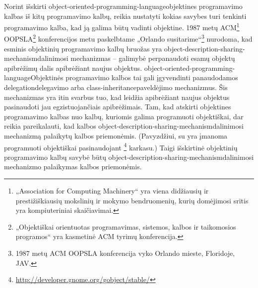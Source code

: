 Norint išskirti \gls{object-oriented-programming-language}{objektines
programavimo kalbas} iš kitų programavimo kalbų, reikia nustatyti
kokias savybes turi tenkinti programavimo kalba, kad ją galima būtų
vadinti objektine. 1987 metų
ACM\footnote{„Association for Computing Machinery“ yra viena didžiausių
ir prestižiškiausių mokslinių ir mokymo bendruomenių, kurių domėjimosi
sritis yra kompiuteriniai skaičiavimai.}
OOPSLA\footnote{„Objektiškai orientuotas programavimas, sistemos, kalbos
ir taikomosios programos“  yra kasmetinė ACM tyrimų konferencija.}
konferencijos metu paskelbtame „Orlando
susitarime“\footnote{1987 metų ACM OOPSLA konferencija vyko Orlando
mieste, Floridoje, JAV.}
\cite{Lieberman:1987:TO:62139.62144} nurodoma, kad esminis
objektinių programavimo kalbų bruožas yra 
\gls{object-description-sharing-mechanism}{dalinimosi 
mechanizmas} – galimybė perpanaudoti esamų objektų apibrėžimų dalis
apibrėžiant naujus objektus.
\gls{object-oriented-programming-language}{Objektinės programavimo kalbos}
tai gali įgyvendinti panaudodamos \gls{delegation}{delegavimo} arba
\gls{class-inheritance}{paveldėjimo}
mechanizmus. Šis mechanizmas yra itin svarbus tuo, kad leidžia
apibrėžiant naujus objektus pasinaudoti jau egzistuojančiais
apibrėžimais. Tam, kad atskirti objektines programavimo kalbas nuo
kalbų, kuriomis galima programuoti objektiškai, dar reikia
pareikalauti, kad kalbos
\gls{object-description-sharing-mechanism}{dalinimosi mechanizmą}
palaikytų kalbos priemonėmis. (Pavyzdžiui, su  yra
įmanoma programuoti objektiškai pasinaudojant
\footnote{%
\url{http://developer.gnome.org/gobject/stable/}} karkasu.)
Taigi išskirtinė objektinių programavimo kalbų savybė būtų
\gls{object-description-sharing-mechanism}{dalinimosi mechanizmo}
palaikymas kalbos priemonėmis.

